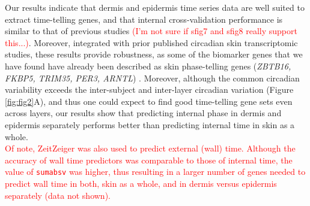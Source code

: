 
Our results indicate that dermis and epidermis time series data are well suited to extract time-telling genes, and that internal cross-validation performance is similar to that of previous studies \cite{Wu2018, Wu2020} \textcolor{red}{(I'm not sure if sfig7 and sfig8 really support this...)}. Moreover, integrated with prior published circadian skin transcriptomic studies, these results provide robustness, as some of the biomarker genes that we have found have already been described as skin phase-telling genes (\textit{ZBTB16, FKBP5, TRIM35, PER3, ARNTL}) \cite{Wu2018, Wu2020}. Moreover, although the common circadian variability exceeds the inter-subject and inter-layer circadian variation (Figure \ref{fig:fig2}A), and thus one could expect to find good time-telling gene sets even across layers, our results show that predicting internal phase in dermis and epidermis separately performs better than predicting internal time in skin as a whole. \\

\textcolor{red}{Of note, ZeitZeiger was also used to predict external (wall) time. Although the accuracy of wall time predictors was comparable to those of internal time, the value of \texttt{sumabsv} was higher, thus resulting in a larger number of genes needed to predict wall time in both, skin as a whole, and in dermis versus epidermis separately (data not shown).}\\

